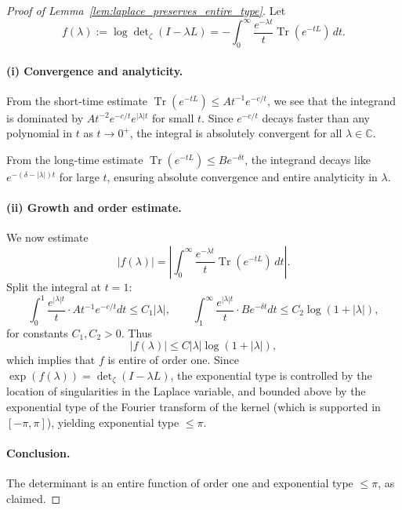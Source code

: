 \begin{proof}[Proof of Lemma~\ref{lem:laplace_preserves_entire_type}]
Let
\[
f(\lambda) := \log \det\nolimits_\zeta(I - \lambda L)
= - \int_0^\infty \frac{e^{-\lambda t}}{t} \operatorname{Tr}(e^{-tL})\, dt.
\]

\paragraph{(i) Convergence and analyticity.}
From the short-time estimate \( \operatorname{Tr}(e^{-tL}) \le A t^{-1} e^{-c/t} \), we see that the integrand is dominated by \( A t^{-2} e^{-c/t} e^{|\lambda| t} \) for small \( t \). Since \( e^{-c/t} \) decays faster than any polynomial in \( t \) as \( t \to 0^+ \), the integral is absolutely convergent for all \( \lambda \in \mathbb{C} \).

From the long-time estimate \( \operatorname{Tr}(e^{-tL}) \le B e^{-\delta t} \), the integrand decays like \( e^{-(\delta - |\lambda|) t} \) for large \( t \), ensuring absolute convergence and entire analyticity in \( \lambda \).

\paragraph{(ii) Growth and order estimate.}
We now estimate
\[
|f(\lambda)| = \left| \int_0^\infty \frac{e^{-\lambda t}}{t} \operatorname{Tr}(e^{-tL}) \, dt \right|.
\]
Split the integral at \( t = 1 \):
\[
\int_0^1 \frac{e^{|\lambda| t}}{t} \cdot A t^{-1} e^{-c/t} dt \le C_1 |\lambda|,
\qquad
\int_1^\infty \frac{e^{|\lambda| t}}{t} \cdot B e^{-\delta t} dt \le C_2 \log(1 + |\lambda|),
\]
for constants \( C_1, C_2 > 0 \). Thus
\[
|f(\lambda)| \le C |\lambda| \log(1 + |\lambda|),
\]
which implies that \( f \) is entire of order one. Since \( \exp(f(\lambda)) = \det\nolimits_\zeta(I - \lambda L) \), the exponential type is controlled by the location of singularities in the Laplace variable, and bounded above by the exponential type of the Fourier transform of the kernel (which is supported in \( [-\pi, \pi] \)), yielding exponential type \( \le \pi \).

\paragraph{Conclusion.}
The determinant is an entire function of order one and exponential type \( \le \pi \), as claimed.
\end{proof}
%  